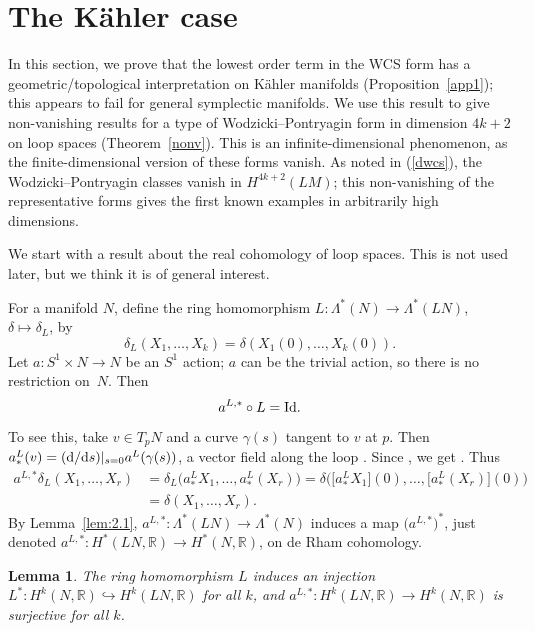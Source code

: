 \documentclass[10pt,a4paper]{amsart}
\numberwithin{equation}{section}
\newtheorem{Lemma}[Theorem]{Lemma}
\theoremstyle{definition}
\newcommand{\BbR}{{\mathbb R}}
\newcommand{\R}{\BbR}
\begin{document}
\section{The K\"ahler case}\label{section5}

In this section, we prove that the lowest order term in the WCS form has
a geometric/topological interpretation on
K\"ahler manifolds (Proposition~\ref{app1}); this appears to fail for general symplectic manifolds. We use this result to give non-vanishing results for a type of Wodzicki--Pontryagin form in dimension $4k+2$ on loop spaces (Theorem~\ref{nonv}).
This is an infinite-dimensional phenomenon, as the finite-dimensional version of these forms vanish.
As noted in (\ref{dwcs}), the Wodzicki--Pontryagin classes vanish in
$H^{4k+2}(LM)$; this non-vanishing of the representative forms gives the first known examples in arbitrarily high dimensions.

We start with a result about the real cohomology of loop spaces. This is not used later, but we think it is of general interest.

For a manifold $N$, define the ring homomorphism $L\colon \Lambda^*(N)\to \Lambda^*(LN)$, $ \delta\mapsto \delta_L$, by
\[\delta_L(X_1,\dots,X_{k}) = \delta(X_1(0),\dots, X_{k}(0)).\]
Let $a\colon S^1\times N\to N$ be an $S^1$ action; $a$ can be the trivial action, so there is no restriction on~$N$. Then
\begin{equation}\label{ident}a^{L,*}\circ L = {\rm Id}.
\end{equation}
To see this, take $v\in T_pN$ and a curve $\gamma(s)$ tangent to $v$ at $p$. Then $a^L_{*}(v)
= ({\rm d}/{\rm d}s)|_{s=0} a^L(\gamma(s))$, a vector field along the loop . Since , we get . Thus
\begin{align*}a^{L,*}\delta_L(X_1,\dots, X_{r}) &= \delta_L\bigl(a^L_{*}X_1,\dots,a^L_{*}(X_{r})\bigr) = \delta
\bigl(\bigl[a^L_{*}X_1\bigr](0),\dots,\bigl[a^L_{*}(X_{r})\bigr](0)\bigr)\\
&= \delta(X_1,\dots,X_r).
\end{align*}
By Lemma~\ref{lem:2.1}, $a^{L,*}\colon \Lambda^*(LN) \to \Lambda^*(N)$ induces a map $\bigl(a^{L,*}\bigr)^*$, just denoted
$a^{L,*}\colon H^*(LN,\R)\to H^*(N,\R)$, on de Rham cohomology.

\begin{Lemma}
The ring homomorphism $L$ induces an injection $L^*\colon H^k(N,\R)\hookrightarrow H^k(LN,\R)$ for all $k$, and
$a^{L,*}\colon H^k(LN,\R)\to H^k(N,\R)$ is surjective for all $k$.
\end{Lemma}
\end{document}
